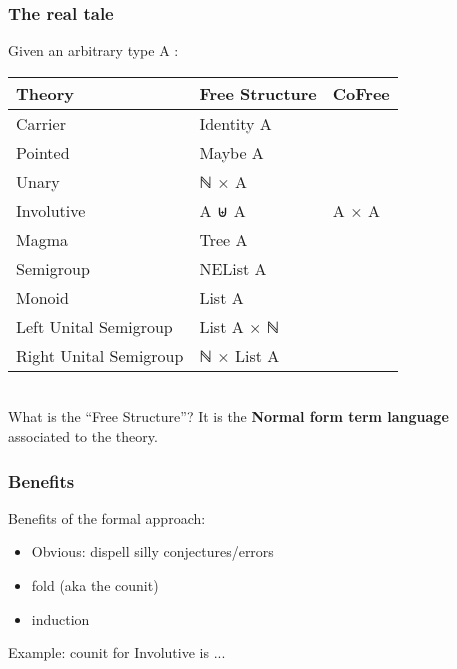 \documentclass[serif,mathserif,professionalfont,10pt]{beamer}
\begin{document}
\begin{frame}
\frametitle{The real tale}
Given an arbitrary type A : \\ \vspace*{4mm}
\begin{tabular}{lll}
\textbf{Theory} & Free \textbf{Structure} & CoFree \\ \hline
Carrier & Identity A & \\
Pointed & Maybe A & \\ \hline
Unary & ℕ × A &  \\
Involutive & A ⊎ A & A × A \\ \hline
Magma & Tree A &  \\
Semigroup & NEList A & \\ \hline
Monoid & List A & \\
Left Unital Semigroup & List A × ℕ & \\
Right Unital Semigroup & ℕ × List A & \\ \hline
\end{tabular}\\ \vspace*{4mm}
\pause
What is the ``Free Structure''? It is the
\textbf{Normal form term language} associated to the theory.\\
\end{frame}

\begin{frame}
\frametitle{Benefits}
Benefits of the formal approach:
\begin{itemize}
\item Obvious: dispell silly conjectures/errors
\item fold (aka the counit)
\item induction
\end{itemize} \vspace*{4mm}
\pause
Example: counit for Involutive is ...
\end{frame}
\end{document}
